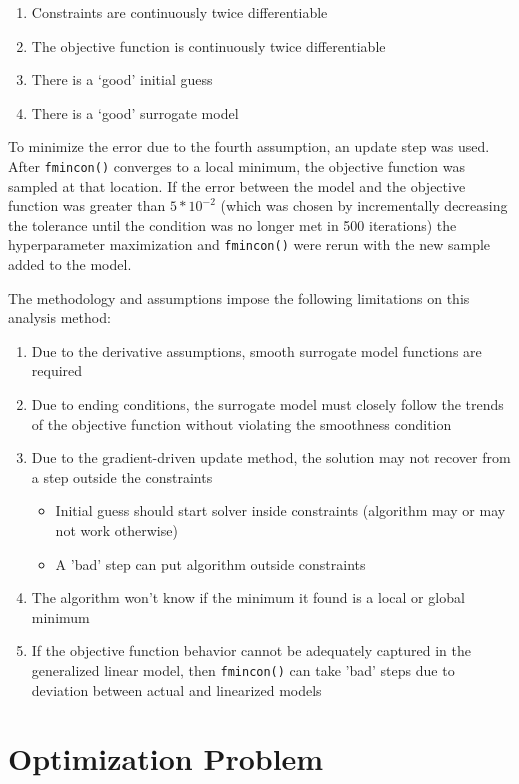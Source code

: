 \documentclass[11pt]{article}%
\begin{document}
\begin{enumerate}
	\item Constraints are continuously twice differentiable
	\item The objective function is continuously twice differentiable
	\item There is a `good' initial guess
	\item There is a `good' surrogate model
\end{enumerate}

To minimize the error due to the fourth assumption, an update step was used. After \lstinline{fmincon()} converges to a local minimum, the objective function was sampled at that location. If the error between the model and the objective function was greater than $5*10^{-2}$ (which was chosen by incrementally decreasing the tolerance until the condition was no longer met in 500 iterations) the hyperparameter maximization and \lstinline{fmincon()} were rerun with the new sample added to the model.

The methodology and assumptions impose the following limitations on this analysis method:
\begin{enumerate}
	\item Due to the derivative assumptions, smooth surrogate model functions are required
	\item Due to ending conditions, the surrogate model must closely follow the trends of the objective function without violating the smoothness condition
	\item Due to the gradient-driven update method, the solution may not recover from a step outside the constraints
	\begin{itemize}
		\item Initial guess should start solver inside constraints (algorithm may or may not work otherwise)
		\item A 'bad' step can put algorithm outside constraints
	\end{itemize}
	\item The algorithm won't know if the minimum it found is a local or global minimum 
	\item If the objective function behavior cannot be adequately captured in the generalized linear model, then \lstinline{fmincon()} can take ’bad’ steps due to deviation between actual and linearized models
\end{enumerate}

\section{Optimization Problem}
\label{sec:problem}
\end{document}
